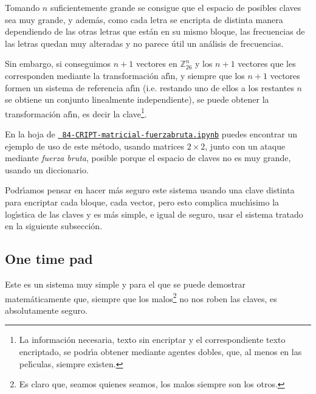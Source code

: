  Tomando $n$ suficientemente grande se consigue que el espacio de posibles
claves sea muy grande, y adem\'as,  como cada letra se encripta de distinta
manera dependiendo de las otras letras que est\'an en su mismo bloque,   las
frecuencias de las letras quedan muy alteradas y no parece \'util un an\'alisis
de frecuencias. 

Sin embargo, si conseguimos $n+1$ vectores  en $\mathbb{Z}_{26}^n$ y los  $n+1$
vectores que les corresponden mediante la transformaci\'on af\'{\i}n, y siempre
que los $n+1$ vectores formen un sistema de referencia af\'{\i}n (i.e. restando
uno de ellos a los restantes $n$ se obtiene un conjunto linealmente
independiente),  se puede obtener la transformaci\'on af\'{\i}n, es decir la
clave\footnote{La informaci\'on necesaria, texto sin encriptar y el
correspondiente texto encriptado,  se podr\'{\i}a obtener mediante agentes
dobles, que,  al menos en las pel\'{\i}culas, siempre existen.}. 


En la hoja de {\sage} 
\href{http://localhost:8888/notebooks/CRIPT/??}{\tt 
84-CRIPT-matricial-fuerzabruta.ipynb}
puedes encontrar un ejemplo de uso de este m\'etodo, usando matrices $2\times 
2$, junto con un ataque mediante {\itshape fuerza bruta}, posible porque el 
espacio de claves no es muy grande,  usando un diccionario. 



Podr\'{\i}amos pensar en hacer m\'as seguro este sistema usando una clave
distinta para encriptar cada bloque, cada vector, pero esto complica
much\'{\i}simo la log\'{\i}stica de las claves y es m\'as simple, e igual de
seguro,  usar el sistema tratado en la siguiente subsecci\'on.











\subsection{One time pad}

Este es un sistema muy simple y para el que se puede demostrar matem\'aticamente
que, siempre que los malos\footnote{Es claro que, seamos quienes seamos, los
malos siempre son los otros.} no nos roben las claves,  es absolutamente seguro.

